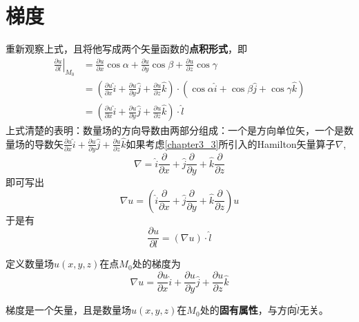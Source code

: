 \section{梯度}
重新观察上式，且将他写成两个矢量函数的\textbf{点积形式}，即
\begin{equation*}
\begin{aligned}
\left. \frac{\partial u}{\partial l} \right|_{M_0}&=\frac{\partial u}{\partial x}\cos \alpha +\frac{\partial u}{\partial y}\cos \beta +\frac{\partial u}{\partial z}\cos \gamma 
\\
&=\left( \frac{\partial u}{\partial x}\hat{i}+\frac{\partial u}{\partial y}\hat{j}+\frac{\partial u}{\partial z}\hat{k} \right) \cdot \left( \cos \alpha \hat{i}+\cos \beta \hat{j}+\cos \gamma \hat{k} \right) 
\\
&=\left( \frac{\partial u}{\partial x}\hat{i}+\frac{\partial u}{\partial y}\hat{j}+\frac{\partial u}{\partial z}\hat{k} \right) \cdot \hat{l}
\end{aligned}
\end{equation*}
上式清楚的表明：数量场的方向导数由两部分组成：一个是方向单位矢，一个是数量场的导数矢$ \frac{\partial u}{\partial x}\hat{i}+\frac{\partial u}{\partial y}\hat{j}+\frac{\partial u}{\partial z}\hat{k}   $如果考虑\ref{chapter3_3}所引入的Hamilton矢量算子$ \nabla $,
\[
\nabla=\hat{i}\frac{\partial}{\partial x}
+\hat{j}\frac{\partial}{\partial y}
+\hat{k}\frac{\partial}{\partial z}
\]
即可写出
\[
\nabla u=  \left(  \hat{i}\frac{\partial}{\partial x}
+\hat{j}\frac{\partial}{\partial y}
+\hat{k}\frac{\partial}{\partial z}
 \right) u 
 \]
 于是有
\[
\frac{\partial u}{\partial l}=\left( \nabla u \right) \cdot \hat{l}
\]

定义数量场$ u\left(x,y,z\right) $在点$ M_0 $处的梯度为
\[
\nabla u=\frac{\partial u}{\partial x}\hat{i}+\frac{\partial u}{\partial y}\hat{j}+\frac{\partial u}{\partial z}\hat{k}
\]

\begin{newdef}[]
	梯度是一个矢量，且是数量场$ u\left(x,y,z\right) $在$ M_0 $处的\textbf{固有属性}，与方向$ \hat{l} $无关。

\end{newdef}





